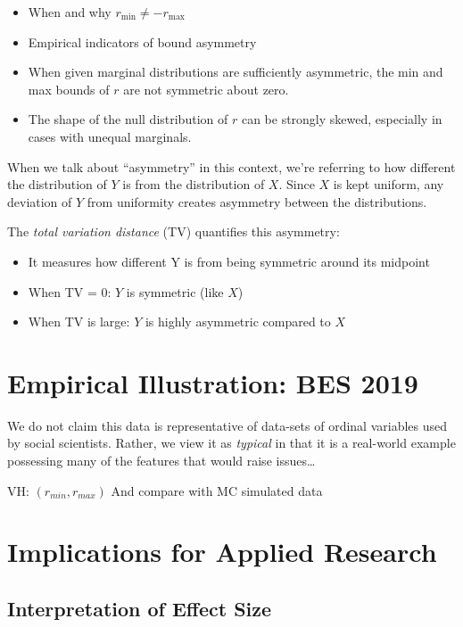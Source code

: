 \documentclass[
  12pt,
]{article}
\providecommand{\tightlist}{%
  \setlength{\itemsep}{0pt}\setlength{\parskip}{0pt}}
\theoremstyle{plain}
\theoremstyle{definition}
\theoremstyle{remark}
\begin{document}
\begin{itemize}
\item
  When and why \(r_{\min} \neq -r_{\max}\)
\item
  Empirical indicators of bound asymmetry
\item
  When given marginal distributions are sufficiently asymmetric, the min
  and max bounds of \(r\) are not symmetric about zero.
\item
  The shape of the null distribution of \(r\) can be strongly skewed,
  especially in cases with unequal marginals.
\end{itemize}

When we talk about ``asymmetry'' in this context, we're referring to how
different the distribution of \(Y\) is from the distribution of \(X\).
Since \(X\) is kept uniform, any deviation of \(Y\) from uniformity
creates asymmetry between the distributions.

The \emph{total variation distance} (TV) quantifies this asymmetry:

\begin{itemize}
\tightlist
\item
  It measures how different Y is from being symmetric around its
  midpoint
\item
  When TV = 0: \(Y\) is symmetric (like \(X\))
\item
  When TV is large: \(Y\) is highly asymmetric compared to \(X\)
\end{itemize}

\section{Empirical Illustration: BES 2019}\label{sec-bes}

We do not claim this data is representative of data-sets of ordinal
variables used by social scientists. Rather, we view it as
\emph{typical} in that it is a real-world example possessing many of the
features that would raise issues\ldots{}

VH: \((r_{min}, r_{max})\) And compare with MC simulated data

\section{Implications for Applied Research}\label{sec-implications}

\subsection{Interpretation of Effect
Size}\label{interpretation-of-effect-size}
\end{document}
